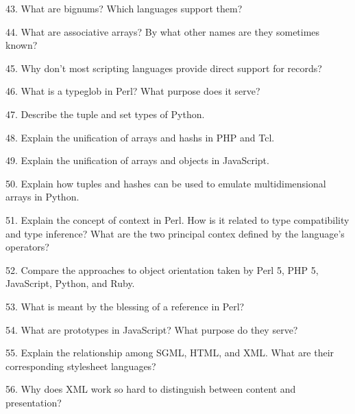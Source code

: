 \filbreak
\vskip 1cm

43. What are bignums? Which languages support them?

\filbreak
\vskip 1cm

44. What are associative arrays? By what other names are they sometimes known?

\filbreak
\vskip 1cm

45. Why don't most scripting languages provide direct support for records?

\filbreak
\vskip 1cm

46. What is a typeglob in Perl? What purpose does it serve?

\filbreak
\vskip 1cm

47. Describe the tuple and set types of Python.

\filbreak
\vskip 1cm

48. Explain the unification of arrays and hashs in PHP and Tcl.

\filbreak
\vskip 1cm

49. Explain the unification of arrays and objects in JavaScript.

\filbreak
\vskip 1cm

50. Explain how tuples and hashes can be used to emulate multidimensional arrays in Python.

\filbreak
\vskip 1cm

51. Explain the concept of context in Perl. How is it related to type compatibility and type inference? What are the two principal contex defined by the language's operators?

\filbreak
\vskip 1cm

52. Compare the approaches to object orientation taken by Perl 5, PHP 5, JavaScript, Python, and Ruby.

\filbreak
\vskip 1cm

53. What is meant by the blessing of a reference in Perl?

\filbreak
\vskip 1cm

54. What are prototypes in JavaScript? What purpose do they serve?

\filbreak
\vskip 1cm

55. Explain the relationship among SGML, HTML, and XML. What are their corresponding stylesheet languages?

\filbreak
\vskip 1cm

56. Why does XML work so hard to distinguish between content and presentation?

\filbreak
\vskip 1cm

